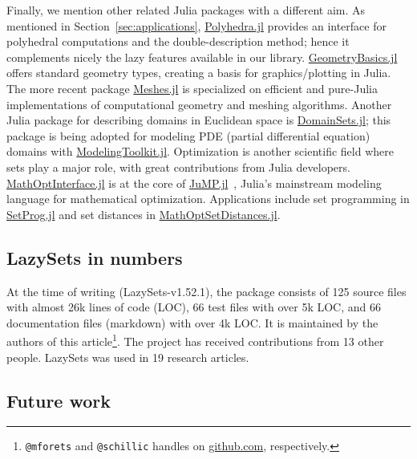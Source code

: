 Finally, we mention other related Julia packages with a different aim.
% 
As mentioned in Section~\ref{sec:applications}, \href{https://github.com/JuliaPolyhedra/Polyhedra.jl}{Polyhedra.jl} \cite{legat2021polyhedra} provides an interface for polyhedral computations and the double-description method; hence it complements nicely the lazy features available in our library.
%
\href{https://github.com/JuliaGeometry/GeometryBasics.jl}{GeometryBasics.jl} offers standard geometry types, creating a basis for graphics/plotting in Julia.
%
The more recent package
\href{https://github.com/JuliaGeometry/Meshes.jl}{Meshes.jl} is specialized on efficient and pure-Julia implementations of computational geometry and meshing algorithms.
%
Another Julia package for describing domains in Euclidean space is \href{https://github.com/JuliaApproximation/DomainSets.jl}{DomainSets.jl}; this package is being adopted for modeling PDE (partial differential equation) domains with \href{https://github.com/SciML/ModelingToolkit.jl}{ModelingToolkit.jl}.
%
Optimization is another scientific field where sets play a major role, with great contributions from Julia developers.
%
\href{https://github.com/jump-dev/MathOptInterface.jl}{MathOptInterface.jl}
\cite{MathOptInterface-2021} is at the core of \href{https://github.com/jump-dev/JuMP.jl}{JuMP.jl}~\cite{DunningHuchetteLubin2017}, Julia's mainstream modeling language for mathematical optimization.
%
Applications include set programming in \href{https://github.com/blegat/SetProg.jl}{SetProg.jl}
and set distances in \href{https://github.com/jump-dev/MathOptSetDistances.jl}{MathOptSetDistances.jl}.

\subsection{LazySets in numbers}

At the time of writing (LazySets-v1.52.1), the package consists of 125 source files with almost 26k lines of code (LOC), 66 test files with over 5k LOC, and 66 documentation files (markdown) with over 4k LOC.
%
It is maintained by the authors of this article\footnote{\texttt{@mforets} and \texttt{@schillic} handles on \href{https://github.com/}{github.com}, respectively.}.
%
The project has received contributions from 13 other people.
%
LazySets was used in 19 research articles.


\subsection{Future work}

